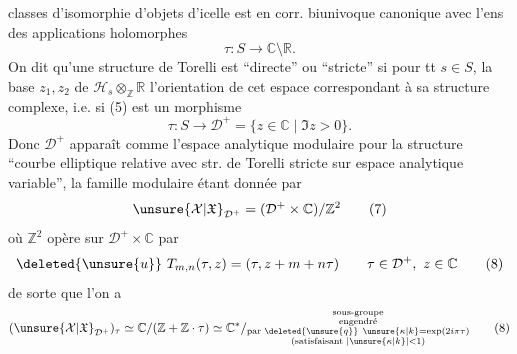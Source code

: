 classes d'isomorphie d'objets d'icelle est en corr. biunivoque canonique avec l'ens des applications holomorphes
\begin{equation}
\tau:S\longrightarrow\mathbb C\setminus\mathbb R.
\tag{5}
\end{equation}
On dit qu'une structure de Torelli est ``directe'' ou ``stricte'' si  pour tt $s\in S$, la base  $z_1,z_2$ de $\mathcal H_s\otimes_{\mathbb Z}\mathbb R$  l'orientation de cet espace correspondant à sa structure complexe, i.e. si (5) est un morphisme
\begin{equation}
\tau:S\longrightarrow\mathcal D^+=\{z\in\mathbb C\mid\Im z>0\}.
\tag{6}
\end{equation}
Donc $\mathcal D^+$ apparaît comme l'espace analytique modulaire pour la structure ``courbe elliptique relative avec str. de Torelli stricte sur espace analytique variable'', la famille modulaire étant donnée par
\begin{equation}
\unsure{\mathcal X|\mathfrak X}_{\mathcal D^+}=(\mathcal D^+\times\mathbb C)/\mathbb Z^2
\tag{7}
\end{equation}
où $\mathbb Z^2$ opère sur $\mathcal D^+\times\mathbb C$ par
\begin{equation}
\deleted{\unsure{u}}\ T_{m,n}(\tau,z)=(\tau,z+m+n\tau)
\qquad\tau\in\mathcal D^+,\ z\in\mathbb C
\tag{8}
\end{equation}
de sorte que l'on a
\begin{equation}
(\unsure{\mathcal X|\mathfrak X}_{\mathcal D^+})_\tau
\simeq\mathbb C/(\mathbb Z+\mathbb Z\cdot\tau)
\simeq\mathbb C^*/\substack{\text{sous-groupe}\\
\text{engendré}\\
\text{par }\deleted{\unsure{q}}\ \unsure{\kappa|k}=\exp(2i\pi\tau)\\
(\text{satisfaisant }|\unsure{\kappa|k}|<1)}
\tag{8}
\end{equation}
